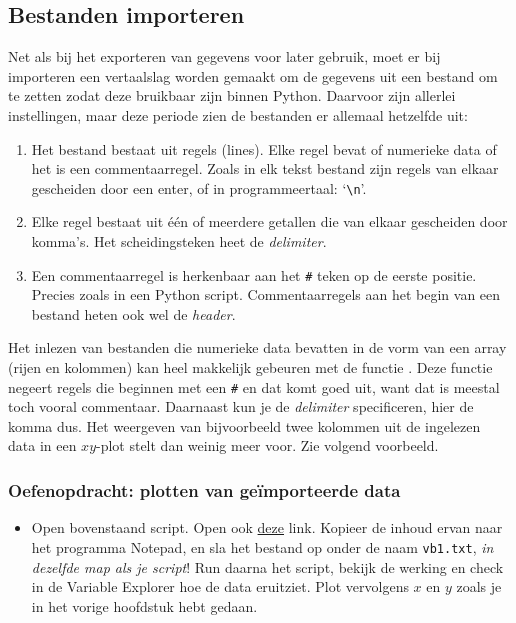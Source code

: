 \documentclass[a4paper,11pt, fleqn]{article}
\begin{document}
\subsection{Bestanden importeren}
\label{Ch_Importeren}
Net als bij het exporteren van gegevens voor later gebruik, moet er bij importeren een vertaalslag worden gemaakt om de gegevens uit een bestand om te zetten zodat deze bruikbaar zijn binnen Python. Daarvoor zijn allerlei instellingen, maar deze periode zien de bestanden er allemaal hetzelfde uit:

\begin{enumerate}
\item Het bestand bestaat uit regels (lines). Elke regel bevat of numerieke data of het is een commentaarregel. Zoals in elk tekst bestand zijn regels van elkaar gescheiden door een enter, of in programmeertaal: `\verb,\n,'.
\item Elke regel bestaat uit \'e\'en of meerdere getallen die van elkaar gescheiden door komma's. Het scheidingsteken heet de \textit{delimiter}.
\item Een commentaarregel is herkenbaar aan het \verb,#, teken op de eerste positie. Precies zoals in een Python script. Commentaarregels aan het begin van een bestand heten ook wel de {\it header}.
\end{enumerate}

Het inlezen van bestanden die numerieke data bevatten in de vorm van een array (rijen en kolommen) kan heel makkelijk gebeuren met de  functie . Deze functie negeert regels die beginnen met een \verb,#, en dat komt goed uit, want dat is meestal toch vooral commentaar. Daarnaast kun je de {\it delimiter} specificeren, hier de komma dus. Het weergeven van bijvoorbeeld twee kolommen uit de ingelezen data in een $xy$-plot stelt dan weinig meer voor. Zie volgend voorbeeld.
 

\subsubsection*{Oefenopdracht: plotten van geïmporteerde data}
\begin{itemize}
	\item Open bovenstaand script. Open ook \href{https://github.com/Ichthus-College-IN/Python-x-Meet-je-leefomgeving/blob/main/code-inc/w4/vb1.txt}{deze} link. Kopieer de inhoud ervan naar het programma Notepad, en sla het bestand op onder de naam \verb,vb1.txt,, {\it in dezelfde map als je script}! Run daarna het script, bekijk de werking en check in de Variable Explorer hoe de data eruitziet. Plot vervolgens $x$ en $y$ zoals je in het vorige hoofdstuk hebt gedaan.
\end{itemize}
\end{document}
